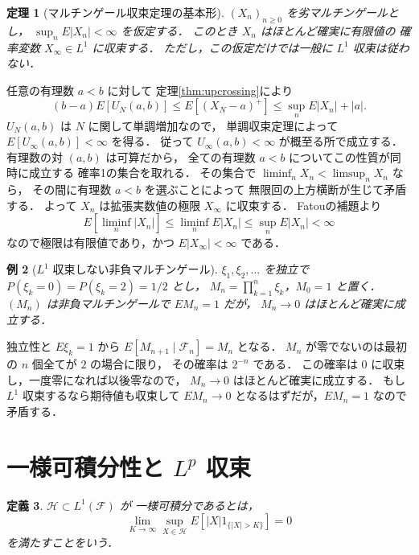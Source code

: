 \documentclass[a5paper,10pt,onecolumn]{jsarticle}
\makeatletter
\theoremstyle{mathnotetheorem}
\newtheorem{theorem}{定理}[section]
\newtheorem{definition}[theorem]{定義}
\newtheorem{example}[theorem]{例}
\renewcommand{\proofname}{証明}
\renewenvironment{proof}[1][\proofname]{%
  \par\pushQED{\qed}\normalfont\topsep4\p@\@plus2\p@\relax
  \trivlist\item[\hskip\labelsep\bfseries #1]\ignorespaces
}{\popQED\endtrivlist\@endpefalse}
\makeatother
\begin{document}
\begin{theorem}[マルチンゲール収束定理の基本形]
\label{thm:mart-conv}
$(X_n)_{n\ge0}$ を劣マルチンゲールとし，
$\sup_nE|X_n|<\infty$ を仮定する．
このとき $X_n$ はほとんど確実に有限値の
確率変数 $X_\infty\in L^1$ に収束する．
ただし，この仮定だけでは一般に $L^1$ 収束は従わない．
\end{theorem}
\begin{proof}
任意の有理数 $a<b$ に対して
定理\ref{thm:upcrossing}により
\[
 (b-a)E[U_N(a,b)]
 \le E[(X_N-a)^+]\le\sup_nE|X_n|+|a|.
\]
$U_N(a,b)$ は $N$ に関して単調増加なので，
単調収束定理によって
$E[U_\infty(a,b)]<\infty$ を得る．
従って $U_\infty(a,b)<\infty$ が概至る所で成立する．
有理数の対 $(a,b)$ は可算だから，
全ての有理数 $a<b$ についてこの性質が同時に成立する
確率1の集合を取れる．
その集合で
$\liminf_nX_n<\limsup_nX_n$ なら，
その間に有理数 $a<b$ を選ぶことによって
無限回の上方横断が生じて矛盾する．
よって $X_n$ は拡張実数値の極限 $X_\infty$ に収束する．
Fatouの補題より
\[
 E[\liminf_n|X_n|]
 \le\liminf_nE|X_n|
 \le\sup_nE|X_n|<\infty
\]
なので極限は有限値であり，かつ $E|X_\infty|<\infty$ である．
\end{proof}

\begin{example}[$L^1$ 収束しない非負マルチンゲール]
$\xi_1,\xi_2,\ldots$ を独立で
$P(\xi_k=0)=P(\xi_k=2)=1/2$ とし，
$M_n=\prod_{k=1}^n\xi_k$，$M_0=1$ と置く．
$(M_n)$ は非負マルチンゲールで $EM_n=1$ だが，
$M_n\to0$ はほとんど確実に成立する．
\end{example}
\begin{proof}
独立性と $E\xi_k=1$ から
$E[M_{n+1}\mid\mathcal F_n]=M_n$ となる．
$M_n$ が零でないのは最初の $n$ 個全てが $2$ の場合に限り，
その確率は $2^{-n}$ である．
この確率は $0$ に収束し，一度零になれば以後零なので，
$M_n\to0$ はほとんど確実に成立する．
もし $L^1$ 収束するなら期待値も収束して
$EM_n\to0$ となるはずだが，$EM_n=1$ なので矛盾する．
\end{proof}

\section{一様可積分性と $L^p$ 収束}

\begin{definition}
$\mathcal H\subset L^1(\mathcal F)$ が
\emph{一様可積分}であるとは，
\[
 \lim_{K\to\infty}
 \sup_{X\in\mathcal H}E[|X|1_{\{|X|>K\}}]=0
\]
を満たすことをいう．
\end{definition}
\end{document}
